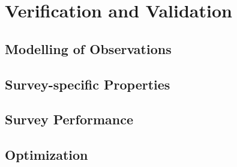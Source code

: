 \chapter{Verification and Validation}

\section{Modelling of Observations}

\section{Survey-specific Properties}

\section{Survey Performance}

\section{Optimization}

